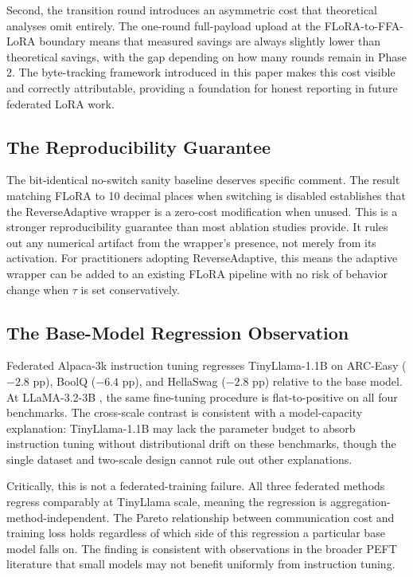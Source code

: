 Second, the transition round introduces an asymmetric cost that theoretical analyses omit entirely. The one-round full-payload upload at the FLoRA-to-FFA-LoRA boundary means that measured savings are always slightly lower than theoretical savings, with the gap depending on how many rounds remain in Phase 2. The byte-tracking framework introduced in this paper makes this cost visible and correctly attributable, providing a foundation for honest reporting in future federated LoRA work.

\subsection{The Reproducibility Guarantee}
The bit-identical no-switch sanity baseline deserves specific comment. The result matching FLoRA \citep{wang2024flora} to 10 decimal places when switching is disabled establishes that the ReverseAdaptive wrapper is a zero-cost modification when unused. This is a stronger reproducibility guarantee than most ablation studies provide. It rules out any numerical artifact from the wrapper's presence, not merely from its activation. For practitioners adopting ReverseAdaptive, this means the adaptive wrapper can be added to an existing FLoRA pipeline with no risk of behavior change when $\tau$ is set conservatively.

\subsection{The Base-Model Regression Observation}
Federated Alpaca-3k \citep{taori2023alpaca} instruction tuning regresses TinyLlama-1.1B \citep{zhang2024tinyllama} on ARC-Easy ($-2.8$ pp), BoolQ ($-6.4$ pp), and HellaSwag ($-2.8$ pp) relative to the base model. At LLaMA-3.2-3B \citep{dubey2024llama3}, the same fine-tuning procedure is flat-to-positive on all four benchmarks. The cross-scale contrast is consistent with a model-capacity explanation: TinyLlama-1.1B may lack the parameter budget to absorb instruction tuning without distributional drift on these benchmarks, though the single dataset and two-scale design cannot rule out other explanations.

Critically, this is not a federated-training failure. All three federated methods regress comparably at TinyLlama scale, meaning the regression is aggregation-method-independent. The Pareto relationship between communication cost and training loss holds regardless of which side of this regression a particular base model falls on. The finding is consistent with observations in the broader PEFT literature that small models may not benefit uniformly from instruction tuning.

